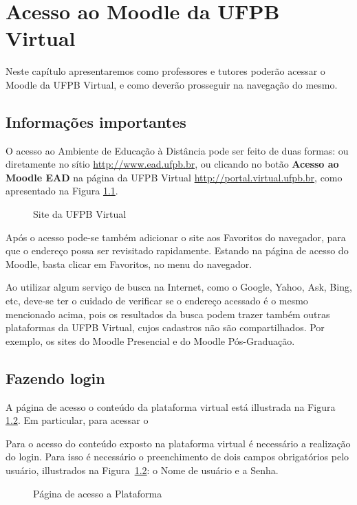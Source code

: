 \chapter{Acesso ao Moodle da UFPB Virtual}
Neste capítulo apresentaremos como professores e tutores poderão acessar o Moodle da UFPB Virtual, e como deverão prosseguir na navegação do mesmo.
\section{Informações importantes}
O acesso ao Ambiente de Educação à Distância pode ser feito de duas formas: ou diretamente no sítio \url{http://www.ead.ufpb.br}, ou 
clicando no botão \textbf{Acesso ao Moodle EAD} na página da UFPB Virtual \url{http://portal.virtual.ufpb.br}, como apresentado na Figura \ref{fig:apresentacao}.

\begin{figure}[htbp]
 \begin{center}
  \caption{Site da UFPB Virtual}
  \label{fig:apresentacao}
 \end{center}
\end{figure}

Após o acesso pode-se também adicionar o site aos Favoritos do navegador, para que o endereço possa ser revisitado rapidamente. 
Estando na página de acesso do Moodle, basta clicar em  Favoritos, no menu do navegador.

Ao utilizar algum serviço de busca na Internet, como o Google, Yahoo, Ask, Bing, etc, deve-se ter o cuidado de verificar se o endereço acessado é o mesmo mencionado acima, pois os resultados da busca podem trazer também outras plataformas da UFPB Virtual, cujos cadastros não são compartilhados. Por exemplo, os sites do Moodle Presencial e do Moodle Pós-Graduação.
\section{Fazendo login}
\label{chap2:sec:login}
A página de acesso o conteúdo da plataforma virtual está illustrada na Figura \ref{fig:login}. Em particular, para acessar o  

Para o acesso do conteúdo exposto na plataforma virtual é necessário a realização do login.
Para isso é necessário o preenchimento de dois campos obrigatórios pelo usuário, illustrados 
na Figura~\ref{fig:login}: o Nome de usuário e a Senha.

\begin{figure}[htbp]
 \begin{center}
  \caption{Página de acesso a Plataforma}
  \label{fig:login}
 \end{center}
\end{figure}

